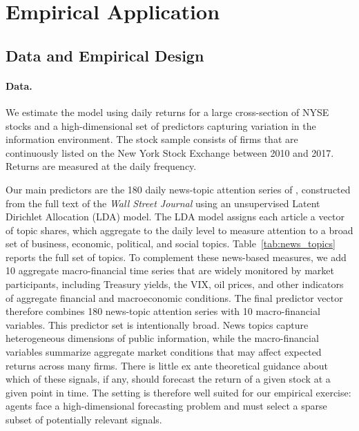 \section{Empirical Application}\label{sec:empirical}

\subsection{Data and Empirical Design}\label{subsec:empirical_data_design}

\paragraph{Data.}

We estimate the model using daily returns for a large cross-section of NYSE stocks and a high-dimensional set of predictors capturing variation in the information environment. The stock sample consists of firms that are continuously listed on the New York Stock Exchange between 2010 and 2017. Returns are measured at the daily frequency.

Our main predictors are the 180 daily news-topic attention series of \citet{Bybee2021}, constructed from the full text of the \textit{Wall Street Journal} using an unsupervised Latent Dirichlet Allocation (LDA) model. The LDA model assigns each article a vector of topic shares, which \citet{Bybee2021} aggregate to the daily level to measure attention to a broad set of business, economic, political, and social topics. Table~\ref{tab:news_topics} reports the full set of topics.
To complement these news-based measures, we add 10 aggregate macro-financial time series that are widely monitored by market participants, including Treasury yields, the VIX, oil prices, and other indicators of aggregate financial and macroeconomic conditions. The final predictor vector therefore combines 180 news-topic attention series with 10 macro-financial variables.
This predictor set is intentionally broad. News topics capture heterogeneous dimensions of public information, while the macro-financial variables summarize aggregate market conditions that may affect expected returns across many firms. There is little ex ante theoretical guidance about which of these signals, if any, should forecast the return of a given stock at a given point in time. The setting is therefore well suited for our empirical exercise: agents face a high-dimensional forecasting problem and must select a sparse subset of potentially relevant signals.

